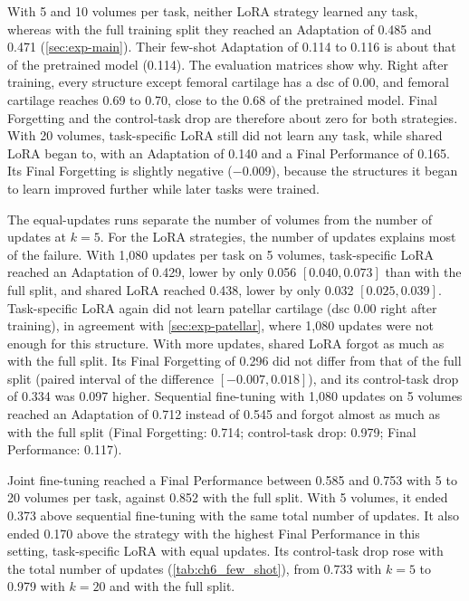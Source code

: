 With 5 and 10 volumes per task, neither LoRA strategy learned any task, whereas with the full training split they reached an Adaptation of 0.485 and 0.471 (\cref{sec:exp-main}).
Their few-shot Adaptation of 0.114 to 0.116 is about that of the pretrained model (0.114).
The evaluation matrices show why.
Right after training, every structure except femoral cartilage has a \gls{dsc} of 0.00, and femoral cartilage reaches 0.69 to 0.70, close to the 0.68 of the pretrained model.
Final Forgetting and the control-task drop are therefore about zero for both strategies.
With 20 volumes, task-specific LoRA still did not learn any task, while shared LoRA began to, with an Adaptation of 0.140 and a Final Performance of 0.165.
Its Final Forgetting is slightly negative ($-0.009$), because the structures it began to learn improved further while later tasks were trained.

The equal-updates runs separate the number of volumes from the number of updates at $k = 5$.
For the LoRA strategies, the number of updates explains most of the failure.
With 1{,}080 updates per task on 5 volumes, task-specific LoRA reached an Adaptation of 0.429, lower by only 0.056 $[0.040, 0.073]$ than with the full split, and shared LoRA reached 0.438, lower by only 0.032 $[0.025, 0.039]$.
Task-specific LoRA again did not learn patellar cartilage (\gls{dsc} 0.00 right after training), in agreement with \cref{sec:exp-patellar}, where 1{,}080 updates were not enough for this structure.
With more updates, shared LoRA forgot as much as with the full split.
Its Final Forgetting of 0.296 did not differ from that of the full split (paired interval of the difference $[-0.007, 0.018]$), and its control-task drop of 0.334 was 0.097 higher.
Sequential fine-tuning with 1{,}080 updates on 5 volumes reached an Adaptation of 0.712 instead of 0.545 and forgot almost as much as with the full split (Final Forgetting: 0.714; control-task drop: 0.979; Final Performance: 0.117).

Joint fine-tuning reached a Final Performance between 0.585 and 0.753 with 5 to 20 volumes per task, against 0.852 with the full split.
With 5 volumes, it ended 0.373 above sequential fine-tuning with the same total number of updates.
It also ended 0.170 above the strategy with the highest Final Performance in this setting, task-specific LoRA with equal updates.
Its control-task drop rose with the total number of updates (\cref{tab:ch6_few_shot}), from 0.733 with $k = 5$ to 0.979 with $k = 20$ and with the full split.

